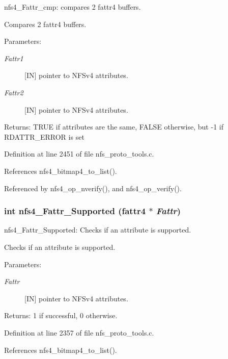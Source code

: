 nfs4\_\-Fattr\_\-cmp: compares 2 fattr4 buffers.

Compares 2 fattr4 buffers.

\begin{Desc}
\item[Parameters:]
\begin{description}
\item[{\em Fattr1}][IN] pointer to NFSv4 attributes. \item[{\em Fattr2}][IN] pointer to NFSv4 attributes.\end{description}
\end{Desc}
\begin{Desc}
\item[Returns:]TRUE if attributes are the same, FALSE otherwise, but -1 if RDATTR\_\-ERROR is set \end{Desc}


Definition at line 2451 of file nfs\_\-proto\_\-tools.c.

References nfs4\_\-bitmap4\_\-to\_\-list().

Referenced by nfs4\_\-op\_\-nverify(), and nfs4\_\-op\_\-verify().
\subsubsection{\setlength{\rightskip}{0pt plus 5cm}int nfs4\_\-Fattr\_\-Supported (fattr4 $\ast$ {\em Fattr})}\label{nfs__proto__tools_8c_a22}


nfs4\_\-Fattr\_\-Supported: Checks if an attribute is supported.

Checks if an attribute is supported.

\begin{Desc}
\item[Parameters:]
\begin{description}
\item[{\em Fattr}][IN] pointer to NFSv4 attributes.\end{description}
\end{Desc}
\begin{Desc}
\item[Returns:]1 if successful, 0 otherwise. \end{Desc}


Definition at line 2357 of file nfs\_\-proto\_\-tools.c.

References nfs4\_\-bitmap4\_\-to\_\-list().

